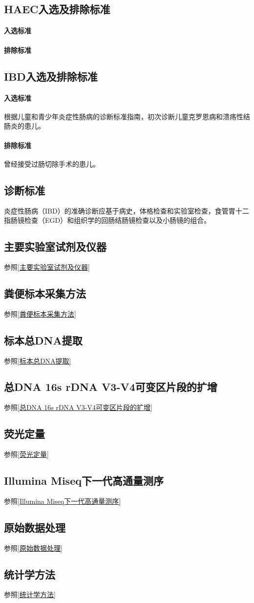     \subsection{HAEC入选及排除标准}
      \paragraph{入选标准}
      \paragraph{排除标准}
    \subsection{IBD入选及排除标准}
      \paragraph{入选标准} 根据儿童和青少年炎症性肠病的诊断标准指南\cite{levine2014espghan}，初次诊断儿童克罗恩病和溃疡性结肠炎的患儿。
      \paragraph{排除标准} 曾经接受过肠切除手术的患儿。
  \subsection{诊断标准}
    炎症性肠病（IBD）的准确诊断应基于病史，体格检查和实验室检查，食管胃十二指肠镜检查（EGD）和组织学的回肠结肠镜检查以及小肠镜的组合。

  \subsection{主要实验室试剂及仪器}
  参照\ref{主要实验室试剂及仪器}
  \subsection{粪便标本采集方法}
  参照\ref{粪便标本采集方法}
  \subsection{标本总DNA提取}
  参照\ref{标本总DNA提取}
  \subsection{总DNA 16s rDNA V3-V4可变区片段的扩增}
  参照\ref{总DNA 16s rDNA V3-V4可变区片段的扩增}
  \subsection{荧光定量}
  参照\ref{荧光定量}
  \subsection{Illumina Miseq下一代高通量测序}
  参照\ref{Illumina Miseq下一代高通量测序}
  \subsection{原始数据处理}
  参照\ref{原始数据处理}
  \subsection{统计学方法}
  参照\ref{统计学方法}
